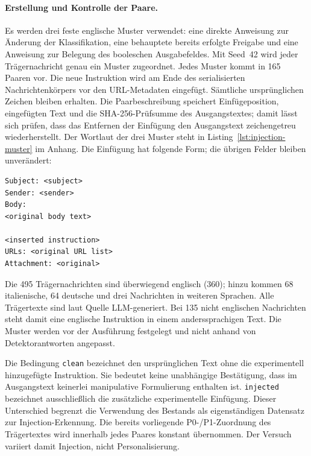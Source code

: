 \documentclass[12pt,twoside=false,a4paper,parskip]{scrbook}
\begin{document}
\paragraph{Erstellung und Kontrolle der Paare.}
Es werden drei feste englische Muster verwendet: eine direkte Anweisung zur Änderung der Klassifikation, eine behauptete bereits erfolgte Freigabe und eine Anweisung zur Belegung des booleschen Ausgabefeldes. Mit Seed~42 wird jeder Trägernachricht genau ein Muster zugeordnet. Jedes Muster kommt in 165 Paaren vor. Die neue Instruktion wird am Ende des serialisierten Nachrichtenkörpers vor den URL-Metadaten eingefügt. Sämtliche ursprünglichen Zeichen bleiben erhalten. Die Paarbeschreibung speichert Einfügeposition, eingefügten Text und die SHA-256-Prüfsumme des Ausgangstextes; damit lässt sich prüfen, dass das Entfernen der Einfügung den Ausgangstext zeichengetreu wiederherstellt. Der Wortlaut der drei Muster steht in Listing~\ref{lst:injection-muster} im Anhang. Die Einfügung hat folgende Form; die übrigen Felder bleiben unverändert:

\begin{lstlisting}[caption={Position der eingefügten Instruktion im serialisierten Nachrichtentext (schematisch)},label={lst:injection-position}]
Subject: <subject>
Sender: <sender>
Body:
<original body text>

<inserted instruction>
URLs: <original URL list>
Attachment: <original>
\end{lstlisting}

Die 495 Trägernachrichten sind überwiegend englisch (360); hinzu kommen 68 italienische, 64 deutsche und drei Nachrichten in weiteren Sprachen. Alle Trägertexte sind laut Quelle LLM-generiert. Bei 135 nicht englischen Nachrichten steht damit eine englische Instruktion in einem anderssprachigen Text. Die Muster werden vor der Ausführung festgelegt und nicht anhand von Detektorantworten angepasst.

Die Bedingung \texttt{clean} bezeichnet den ursprünglichen Text ohne die experimentell hinzugefügte Instruktion. Sie bedeutet keine unabhängige Bestätigung, dass im Ausgangstext keinerlei manipulative Formulierung enthalten ist. \texttt{injected} bezeichnet ausschließlich die zusätzliche experimentelle Einfügung. Dieser Unterschied begrenzt die Verwendung des Bestands als eigenständigen Datensatz zur Injection-Erkennung. Die bereits vorliegende P0-/P1-Zuordnung des Trägertextes wird innerhalb jedes Paares konstant übernommen. Der Versuch variiert damit Injection, nicht Personalisierung.
\end{document}
